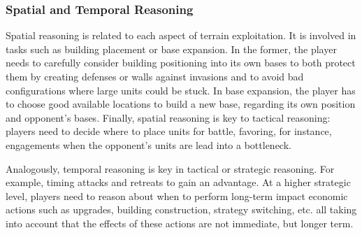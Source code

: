 \documentclass{llncs}
\begin{document}
\subsubsection{Spatial and Temporal Reasoning}
Spatial reasoning is  related to each aspect  of terrain exploitation.
It  is  involved   in  tasks  such  as  building   placement  or  base
expansion.  In the  former,  the player  needs  to carefully  consider
building  positioning into  its  own  bases to  both  protect them  by
creating  defenses or walls  against invasions  and to  avoid bad  configurations
where large units could be stuck. In base expansion, the player has to
choose good available locations to build a new base, regarding its own
position and  opponent's bases. Finally,  spatial reasoning is  key to
tactical reasoning:  players need to  decide where to place  units for
battle, favoring, for instance,  engagements when the opponent's units
are lead into a bottleneck.



Analogously,  temporal  reasoning  is  key in  tactical  or  strategic
reasoning.  For  example,  timing  attacks and  retreats  to  gain  an
advantage. At a  higher strategic level, players need  to reason about
when to  perform long-term impact  economic actions such  as upgrades,
building  construction,  strategy  switching,  etc.  all  taking  into
account  that the  effects of  these  actions are  not immediate,  but
longer term.
\end{document}
